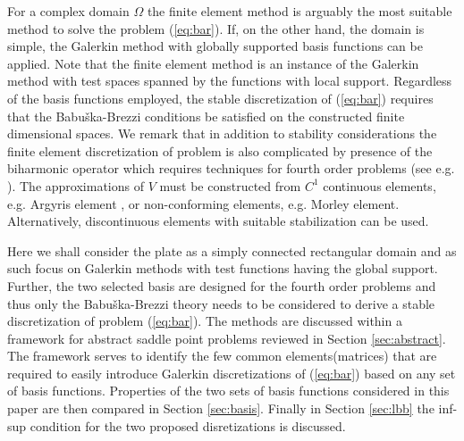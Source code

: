 \documentclass{marine_2015}
\begin{document}
For a complex domain $\Omega$ the finite element method is arguably the most 
suitable method to solve the problem (\ref{eq:bar}). If, on the other hand, the
domain is simple, the Galerkin method with globally supported basis functions
can be applied. Note that the finite element method is an instance of the Galerkin 
method with test spaces spanned by the functions with local support. Regardless
of the basis functions employed, the stable discretization of (\ref{eq:bar})
requires that the Babu\v{s}ka-Brezzi conditions be satisfied on the constructed
finite dimensional spaces. We remark that in addition to stability
considerations the finite element discretization of problem is also complicated
by presence of the biharmonic operator which requires techniques for fourth order 
problems (see e.g. \cite{brenner}). The approximations of $V$ must be constructed 
from $C^1$ continuous elements, e.g. Argyris element \cite{argyris}, or non-conforming 
elements, e.g. Morley element\cite{morley}. Alternatively, discontinuous elements with 
suitable stabilization \cite{brenner_ip} can be used. 

Here we shall consider the plate as a simply connected rectangular domain and as
such focus on Galerkin methods with test functions having the global support.
Further, the two selected basis are designed for the fourth order problems and thus 
only the Babu\v{s}ka-Brezzi theory needs to be considered to derive a stable
discretization of problem (\ref{eq:bar}). The methods are discussed within a
framework for abstract saddle point problems reviewed in Section
\ref{sec:abstract}. The framework serves to identify the few common
elements(matrices) that are required to easily introduce Galerkin discretizations of
(\ref{eq:bar}) based on any set of basis functions. Properties of the two sets of
basis functions considered in this paper are then compared in Section \ref{sec:basis}.
Finally in Section \ref{sec:lbb} the inf-sup condition for the two proposed
disretizations is discussed.
\end{document}
